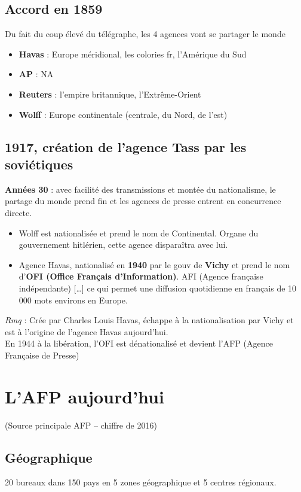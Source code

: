 \documentclass[a4paper,11pt]{report}
\begin{document}
\section{Accord en 1859}
Du fait du coup élevé du télégraphe, les 4 agences vont se partager le monde \\
\begin{itemize}
    \item \textbf{Havas} : Europe méridional, les colories fr, l’Amérique du Sud 
    \item \textbf{AP} : NA
    \item \textbf{Reuters} : l’empire britannique, l’Extrême-Orient
    \item \textbf{Wolff} : Europe continentale (centrale, du Nord, de l’est)
\end{itemize}

\section{1917, création de l’agence Tass par les soviétiques}
\textbf{Années 30} : avec facilité des transmissions et montée du nationalisme, le partage du monde prend fin et les agences de presse entrent en concurrence directe.
\begin{itemize}
    \item Wolff est nationalisée et prend le nom de Continental. Organe du gouvernement hitlérien, cette agence disparaîtra avec lui.
    \item Agence Havas, nationalisé en \textbf{1940} par le gouv de \textbf{Vichy} et prend le nom d’\textbf{OFI (Office Français d’Information)}. 
    AFI (Agence française indépendante) […] ce qui permet une diffusion quotidienne en français de 10 000 mots environs en Europe.
\end{itemize}

\textit{Rmq} : Crée par Charles Louis Havas, échappe à la nationalisation par Vichy et est à l’origine de l’agence Havas aujourd’hui. \\
En 1944 à la libération, l’OFI est dénationalisé et devient l’AFP (Agence Française de Presse)

\chapter{L’AFP aujourd’hui}
(Source principale AFP – chiffre de 2016)
\section{Géographique}
20 bureaux dans 150 pays en 5 zones géographique et 5 centres régionaux.
\end{document}
